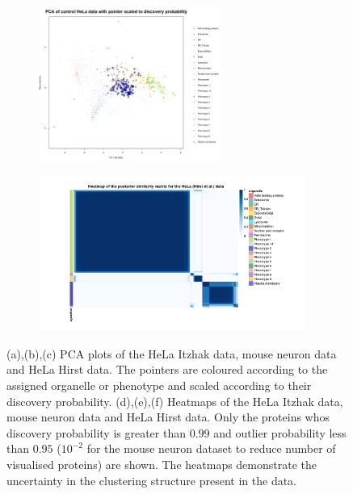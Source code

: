 \documentclass[12pt,english]{article}
\begin{document}
\begin{figure}
\begin{subfigure}[t]{0.5\textwidth}
		\caption{}
	\end{subfigure}
	~
	\begin{subfigure}[t]{0.5\textwidth}
		\centering
		\includegraphics[height=2in]{pcaHirst.pdf}
		\caption{}
	\end{subfigure}
	\begin{subfigure}[t]{0.5\textwidth}
		\centering
		\includegraphics[height=2in]{heatmapHirst.jpg}
		\caption{}
	\end{subfigure}
	\caption{(a),(b),(c) PCA plots of the HeLa Itzhak data, mouse neuron data and HeLa Hirst data. The pointers are coloured according to the assigned organelle or phenotype and scaled according to their discovery probability. (d),(e),(f) Heatmaps of the HeLa Itzhak data, mouse neuron data and HeLa Hirst data. Only the proteins whos discovery probability is greater than $0.99$ and outlier probability less than $0.95$ ($10^{-2}$ for the mouse neuron dataset to reduce number of visualised proteins) are shown. The heatmaps demonstrate the uncertainty in the clustering structure present in the data.}
	\label{figure:DOM}
\end{figure}
\clearpage
\end{document}
